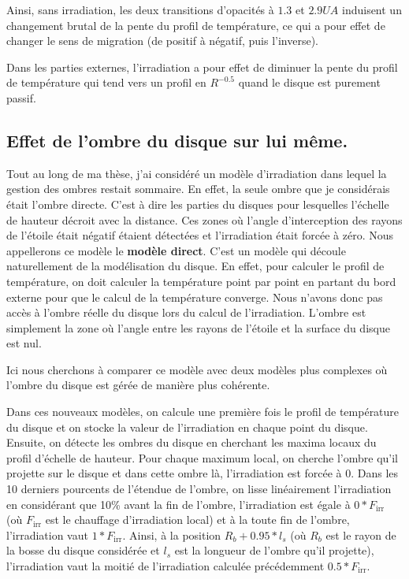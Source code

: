 Ainsi, sans irradiation, les deux transitions d'opacités à $1.3$ et $2.9\unit{UA}$ induisent un changement brutal de la pente
du profil de température, ce qui a pour effet de changer le sens de migration (de positif à négatif, puis l'inverse).

Dans les parties externes, l'irradiation a pour effet de diminuer la pente du profil de température qui tend vers un profil en
$R^{-0.5}$ quand le disque est purement passif.


\subsection{Effet de l'ombre du disque sur lui même.}
Tout au long de ma thèse, j'ai considéré un modèle d'irradiation dans lequel la gestion des ombres restait sommaire. En effet, la seule ombre que je considérais était l'ombre directe. C'est à dire les parties du disques pour lesquelles l'échelle de hauteur décroit avec la distance. Ces zones où l'angle d'interception des rayons de l'étoile était négatif étaient détectées et l'irradiation était forcée à zéro. Nous appellerons ce modèle le \textbf{modèle direct}. C'est un modèle qui découle naturellement de la modélisation du disque. En effet, pour calculer le profil de température, on doit calculer la température point par point en partant du bord externe pour que le calcul de la température converge. Nous n'avons donc pas accès à l'ombre réelle du disque lors du calcul de l'irradiation. L'ombre est simplement la zone où l'angle entre les rayons de l'étoile et la surface du disque est nul.

Ici nous cherchons à comparer ce modèle avec deux modèles plus complexes où l'ombre du disque est gérée de manière plus cohérente. 

Dans ces nouveaux modèles, on calcule une première fois le profil de température du disque et on stocke la valeur de l'irradiation en chaque point du disque. Ensuite, on détecte les ombres du disque en cherchant les maxima locaux du profil d'échelle de hauteur. Pour chaque maximum local, on cherche l'ombre qu'il projette sur le disque et dans cette ombre là, l'irradiation est forcée à 0. Dans les 10 derniers pourcents de l'étendue de l'ombre, on lisse linéairement l'irradiation en considérant que 10\% avant la fin de l'ombre, l'irradiation est égale à $0 * F_\text{irr}$ (où $F_\text{irr}$ est le chauffage d'irradiation local) et à la toute fin de l'ombre, l'irradiation vaut $1 * F_\text{irr}$. Ainsi, à la position $R_b + 0.95 * l_s$ (où $R_b$ est le rayon de la bosse du disque considérée et $l_s$ est la longueur de l'ombre qu'il projette), l'irradiation vaut la moitié de l'irradiation calculée précédemment $0.5 * F_\text{irr}$. 

